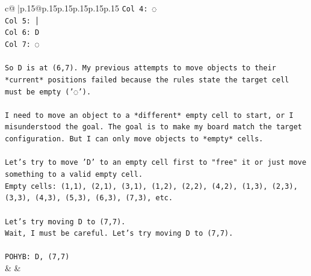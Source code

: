 \documentclass{article}
\begin{document}
{\begin{supertabular}{c@{$\;$}|p{.15\linewidth}@{}p{.15\linewidth}p{.15\linewidth}p{.15\linewidth}p{.15\linewidth}p{.15\linewidth}}
{{{\texttt{Col 4: ◌} \\
\texttt{Col 5: │} \\
\texttt{Col 6: D} \\
\texttt{Col 7: ◌} \\
\\ 
\texttt{So D is at (6,7). My previous attempts to move objects to their *current* positions failed because the rules state the target cell must be empty ('◌').} \\
\\ 
\texttt{I need to move an object to a *different* empty cell to start, or I misunderstood the goal. The goal is to make my board match the target configuration. But I can only move objects to *empty* cells.} \\
\\ 
\texttt{Let's try to move 'D' to an empty cell first to "free" it or just move something to a valid empty cell.} \\
\texttt{Empty cells: (1,1), (2,1), (3,1), (1,2), (2,2), (4,2), (1,3), (2,3), (3,3), (4,3), (5,3), (6,3), (7,3), etc.} \\
\\ 
\texttt{Let's try moving D to (7,7).} \\
\texttt{Wait, I must be careful. Let's try moving D to (7,7).} \\
\\ 
\texttt{POHYB: D, (7,7)} \\
            }
        }
    }
    & & \\ \\


\end{supertabular}}
\end{document}
